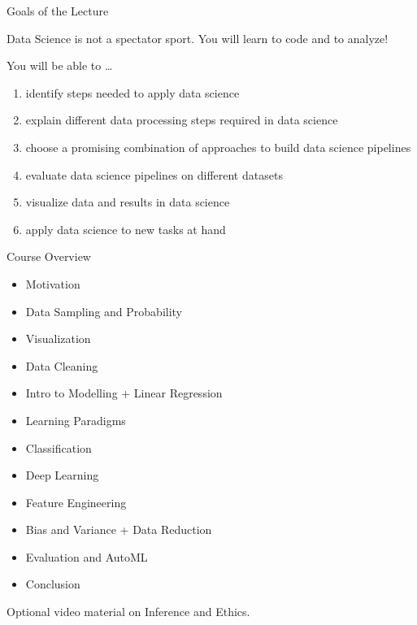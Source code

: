 \documentclass[aspectratio=169,handout]{../latex_main/tntbeamer}  %
\begin{document}
\begin{frame}[c]{Goals of the Lecture}

Data Science is not a spectator sport.
You will learn to code and to analyze!

You will be able to \ldots
\begin{enumerate}
  \item \alert{identify} steps needed to apply data science
  \pause
  \item \alert{explain} different data processing steps required in data science
  \pause
  \item \alert{choose} a promising combination of approaches to build data science pipelines
  \pause
  \item \alert{evaluate} data science pipelines on different datasets
  \pause
  \item \alert{visualize} data and results in data science
  \pause
  \item \alert{apply} data science to new tasks at hand
\end{enumerate}

\end{frame}
\begin{frame}[c]{Course Overview}

\vspace*{-2em}
\begin{itemize} 
    \item Motivation
	\item Data Sampling and Probability 
        \item Visualization 
        \item Data Cleaning 
	\pause
	\item Intro to Modelling + Linear Regression 
	\item Learning Paradigms
	\item Classification 
        \item Deep Learning
        \pause
        \item Feature Engineering 	
        \item Bias and Variance + Data Reduction 
        \item Evaluation and AutoML 
	\pause
	\item Conclusion 
\end{itemize}

Optional video material on Inference and Ethics.


\end{frame}
\end{document}
